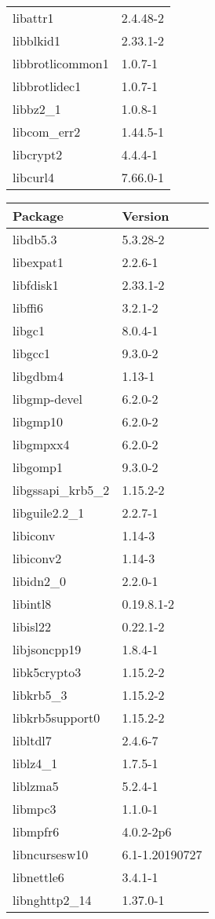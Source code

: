 \documentclass[11pt, english, openany]{report}
\begin{document}
\begin{appendices}
\begin{center}
\begin{tabular}{|m{4cm}|m{4cm}|}
libattr1 & 2.4.48-2 \\
libblkid1 & 2.33.1-2 \\
libbrotlicommon1 & 1.0.7-1 \\
libbrotlidec1 & 1.0.7-1 \\
libbz2\_1 & 1.0.8-1 \\
libcom\_err2 & 1.44.5-1 \\
libcrypt2 & 4.4.4-1 \\
libcurl4 & 7.66.0-1 \\
\hline
\end{tabular}
\begin{tabular}{|m{3cm}|m{3cm}|}
Package & Version \\
\hline
libdb5.3 & 5.3.28-2 \\
libexpat1 & 2.2.6-1 \\
libfdisk1 & 2.33.1-2 \\
libffi6 & 3.2.1-2 \\
libgc1 & 8.0.4-1 \\
libgcc1 & 9.3.0-2 \\
libgdbm4 & 1.13-1 \\
libgmp-devel & 6.2.0-2 \\
libgmp10 & 6.2.0-2 \\
libgmpxx4 & 6.2.0-2 \\
libgomp1 & 9.3.0-2 \\
libgssapi\_krb5\_2 & 1.15.2-2 \\
libguile2.2\_1 & 2.2.7-1 \\
libiconv & 1.14-3 \\
libiconv2 & 1.14-3 \\
libidn2\_0 & 2.2.0-1 \\
libintl8 & 0.19.8.1-2 \\
libisl22 & 0.22.1-2 \\
libjsoncpp19 & 1.8.4-1 \\
libk5crypto3 & 1.15.2-2 \\
libkrb5\_3 & 1.15.2-2 \\
libkrb5support0 & 1.15.2-2 \\
libltdl7 & 2.4.6-7 \\
liblz4\_1 & 1.7.5-1 \\
liblzma5 & 5.2.4-1 \\
libmpc3 & 1.1.0-1 \\
libmpfr6 & 4.0.2-2p6 \\
libncursesw10 & 6.1-1.20190727 \\
libnettle6 & 3.4.1-1 \\
libnghttp2\_14 & 1.37.0-1 \\

\end{tabular}
\end{center}
\end{appendices}
\end{document}
